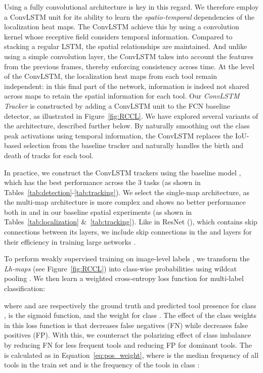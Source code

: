 \documentclass{svjour3}                     \smartqed
\begin{document}
Using a fully convolutional architecture is key in this regard. We therefore employ a ConvLSTM unit for its ability to learn the \emph{spatio-temporal} dependencies of the localization heat maps. The ConvLSTM achieve this by using a convolution kernel whose receptive field considers temporal information. Compared to stacking a regular LSTM, the spatial relationships are maintained.  And unlike using a simple convolution layer, the ConvLSTM takes into account the features from the previous frames, thereby enforcing consistency across time. At the level of the ConvLSTM, the localization heat maps from each tool remain independent: in this final part of the network, information is indeed not shared across maps to retain the spatial information for each tool. Our \emph{ConvLSTM Tracker} is constructed by adding a ConvLSTM unit to the FCN baseline detector, as illustrated in Figure~\ref{fig:RCCL}. We have explored several variants of the architecture, described further below. 
By naturally smoothing out the class peak activations using temporal information, the ConvLSTM replaces the IoU-based selection from the baseline tracker and naturally handles the birth and death of tracks for each tool. 

In practice, we construct the ConvLSTM trackers using the baseline model , which has the best performance across the 3 tasks (as shown in Tables~\ref{tab:detection}-\ref{tab:tracking}). We select the single-map architecture, as the multi-map architecture is more complex and shows no better performance both in \cite{miccai:vardazaryan2018weakly} and in our baseline spatial experiments (as shown in Tables~\ref{tab:localization} \&~\ref{tab:tracking}). 
Like in ResNet (), which contains skip connections between its layers, we include skip connections in the  and  layers for their efficiency in training large networks \cite{cvpr:he2016deep,iwwwcsw:wei2018residual}.

To perform weakly supervised training on image-level labels , we transform the \emph{Lh-maps} (see Figure~\ref{fig:RCCL}) into class-wise probabilities  using wildcat pooling \cite{cvpr:durand2017wildcat}.
We then learn a weighted cross-entropy loss function  for multi-label classification:

where  and  are respectively the ground truth and predicted tool presence for class ,  is the sigmoid function, and  the weight for class . 
The effect of the class weights  in this loss function is that  decreases false negatives (FN) while  decreases false positives (FP). With this, we counteract the polarizing effect of class imbalance by reducing FN for less frequent tools and reducing FP for dominant tools. The  is calculated as in Equation~\ref{eq:pos_weight}, where  is the median frequency of all tools in the train set and  is the frequency of the tools in class :
\end{document}
